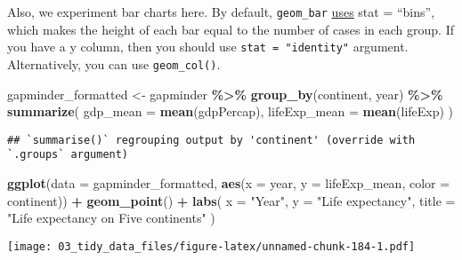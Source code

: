 \documentclass[
]{book}
\newenvironment{Shaded}{\begin{snugshade}}{\end{snugshade}}
\newcommand{\DataTypeTok}[1]{\textcolor[rgb]{0.13,0.29,0.53}{#1}}
\newcommand{\KeywordTok}[1]{\textcolor[rgb]{0.13,0.29,0.53}{\textbf{#1}}}
\newcommand{\NormalTok}[1]{#1}
\newcommand{\OperatorTok}[1]{\textcolor[rgb]{0.81,0.36,0.00}{\textbf{#1}}}
\newcommand{\StringTok}[1]{\textcolor[rgb]{0.31,0.60,0.02}{#1}}
\begin{document}
Also, we experiment bar charts here. By default, \texttt{geom\_bar} \href{https://www.rdocumentation.org/packages/ggplot2/versions/1.0.1/topics/geom_bar}{uses} stat = ``bins'', which makes the height of each bar equal to the number of cases in each group. If you have a y column, then you should use \texttt{stat\ =\ "identity"} argument. Alternatively, you can use \texttt{geom\_col()}.

\begin{Shaded}
\begin{Highlighting}[]
\NormalTok{gapminder\_formatted \textless{}{-}}\StringTok{ }\NormalTok{gapminder }\OperatorTok{\%\textgreater{}\%}
\StringTok{  }\KeywordTok{group\_by}\NormalTok{(continent, year) }\OperatorTok{\%\textgreater{}\%}
\StringTok{  }\KeywordTok{summarize}\NormalTok{(}
    \DataTypeTok{gdp\_mean =} \KeywordTok{mean}\NormalTok{(gdpPercap),}
    \DataTypeTok{lifeExp\_mean =} \KeywordTok{mean}\NormalTok{(lifeExp)}
\NormalTok{  )}
\end{Highlighting}
\end{Shaded}

\begin{verbatim}
## `summarise()` regrouping output by 'continent' (override with `.groups` argument)
\end{verbatim}

\begin{Shaded}
\begin{Highlighting}[]
\KeywordTok{ggplot}\NormalTok{(}\DataTypeTok{data =}\NormalTok{ gapminder\_formatted, }\KeywordTok{aes}\NormalTok{(}\DataTypeTok{x =}\NormalTok{ year, }\DataTypeTok{y =}\NormalTok{ lifeExp\_mean, }\DataTypeTok{color =}\NormalTok{ continent)) }\OperatorTok{+}
\StringTok{  }\KeywordTok{geom\_point}\NormalTok{() }\OperatorTok{+}
\StringTok{  }\KeywordTok{labs}\NormalTok{(}
    \DataTypeTok{x =} \StringTok{"Year"}\NormalTok{,}
    \DataTypeTok{y =} \StringTok{"Life expectancy"}\NormalTok{,}
    \DataTypeTok{title =} \StringTok{"Life expectancy on Five continents"}
\NormalTok{  )}
\end{Highlighting}
\end{Shaded}

\texttt{[image: 03\_tidy\_data\_files/figure-latex/unnamed-chunk-184-1.pdf]}
\end{document}
